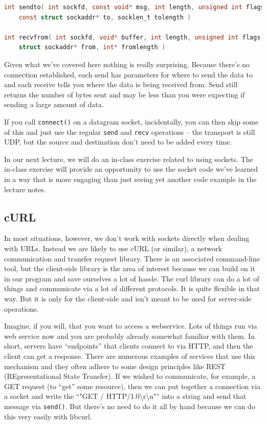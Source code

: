 \documentclass[a4paper]{report}
\begin{document}
\begin{lstlisting}[language=C]
int sendto( int sockfd, const void* msg, int length, unsigned int flags, 
    const struct sockaddr* to, socklen_t tolength )

int recvfrom( int sockfd, void* buffer, int length, unsigned int flags, 
    struct sockaddr* from, int* fromlength )
\end{lstlisting}

Given what we've covered here nothing is really surprising. Because there's no connection  established, each send has parameters for where to send the data to and each receive tells you where the data is being received from. Send still returns the number of bytes sent and may be less than you were expecting if sending a large amount of data.

If you call \texttt{connect()} on a datagram socket, incidentally, you can then skip some of this and just use the regular \texttt{send} and \texttt{recv} operations -- the transport is still UDP, but the source and destination don't need to be added every time.

In our next lecture, we will do an in-class exercise related to using sockets. The in-class exercise will provide an opportunity to use the socket code we've learned in a way that is more engaging than just seeing yet another code example in the lecture notes.


\subsection*{cURL}
In most situations, however, we don't work with sockets directly when dealing with URLs. Instead we are likely to use cURL (or similar), a network communication and transfer request library. There is an associated command-line tool, but the client-side library is the area of interest because we can build on it in our program and save ourselves a lot of hassle. The curl library can do a lot of things and communicate via a lot of different protocols. It is quite flexible in that way. But it is only for the client-side and isn't meant to be used for server-side operations.

Imagine, if you will, that you want to access a webservice. Lots of things run via web service now and you are probably already somewhat familiar with them. In short, servers have ``endpoints'' that clients connect to via HTTP, and then the client can get a response. There are numerous examples of services that use this mechanism and they often adhere to some design principles like REST (REpresentational State Transfer). If we wished to communicate, for example, a GET request (to ``get'' some resource), then we can put together a connection via a socket and write the ``"GET / HTTP/1.0\textbackslash r\textbackslash n"'' into a string and send that message via \texttt{send()}. But there's no need to do it all by hand because we can do this very easily with libcurl.
\end{document}
